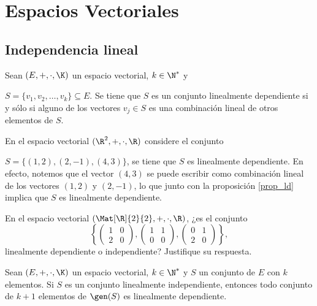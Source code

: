 \documentclass[compacto,10pt]{pubciencias-notas}
\begin{document}
\setcounter{section}{3}
\section{Espacios Vectoriales}
\setcounter{subsection}{5}
\subsection{Independencia lineal}

\begin{prop}\label{prop_ld}
    Sean $(E,+,\cdot,\K)$ un espacio vectorial, $k\in\N^{*}$ y
    
    \noindent $S=\{v_1,v_2,\ldots,v_k\}\subseteq E$. Se tiene que $S$ es un conjunto linealmente dependiente si y sólo si alguno de los vectores $v_j\in S$ es una combinación lineal de otros elementos de $S$.
\end{prop}

\begin{ejem}\hspace{0pt} En el espacio vectorial $(\R^{2},+,\cdot,\R)$ considere el conjunto 

\noindent $S = \{(1, 2), (2, -1), (4, 3)\}$, se tiene que $S$ es linealmente dependiente. En efecto, notemos que el vector $(4, 3)$ se puede escribir como combinación lineal de los vectores $(1, 2)$ y  $(2, -1)$, lo que junto con la proposición \ref{prop_ld} implica que $S$ es linealmente dependiente.
\end{ejem}

\begin{ejer}\hspace{0pt} En el espacio vectorial $(\Mat[\R]{2}{2}, +, \cdot, \R)$, 
¿es el conjunto \[\left\{\begin{pmatrix} 1 & 0\\ 2 & 0 \end{pmatrix}, \begin{pmatrix} 1 & 1\\ 0 & 0 \end{pmatrix}, \begin{pmatrix} 0 & 1\\ 2 & 0 \end{pmatrix} \right\},\] linealmente dependiente o independiente? Justifique su respuesta.
\end{ejer}

\begin{prop}
Sean $(E, +, \cdot, \K)$ un espacio vectorial, $k\in\N^{*}$ y $S$ un conjunto de $E$ con $k$ elementos. Si $S$ es un conjunto linealmente independiente, entonces todo conjunto de $k + 1$ elementos de $\gen(S)$ es linealmente dependiente.
\end{prop}
\end{document}

